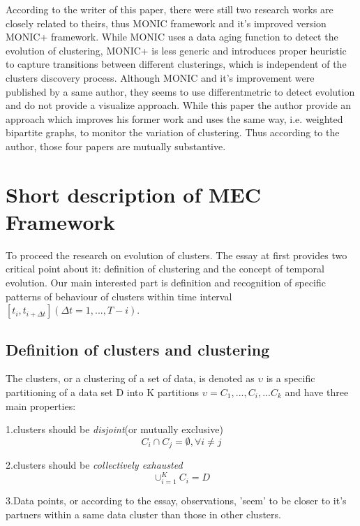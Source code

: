 \documentclass{sig-alternate}
\begin{document}
According to the writer of this paper, there were still two research works are closely related to theirs, thus MONIC framework\cite{SPILIOPOULOU:transition} and it's improved version MONIC+ framework\cite{SPILIOPOULOU:tracing}. While MONIC uses a data aging function to detect the evolution of clustering, MONIC+ is less generic and introduces proper heuristic to capture transitions between different clusterings, which is independent of the clusters discovery process. Although MONIC and it's improvement were published by a same author, they seems to use differentmetric to detect evolution and do not provide a visualize approach. While this paper the author provide an approach which improves his former work\cite{OLIVEIRA:bipartite} and uses the same way, i.e. weighted bipartite graphs, to monitor the variation of clustering. Thus according to the author, those four papers are mutually substantive.

\section{Short description of MEC Framework}
To proceed the research on evolution of clusters. The essay at first provides two critical point about it: definition of clustering and the concept of temporal evolution. Our main interested part is definition and recognition of specific patterns of behaviour of clusters within time interval $[t_i, t_{i+\Delta t}] (\Delta t = 1,...,T-i)$.
\subsection{Definition of clusters and clustering}
The clusters, or a clustering of a set of data, is denoted as $\upsilon$ is a specific partitioning of a data set D into K partitions $\upsilon = {C_1,...,C_i,...C_k}$ and have three main properties:

    1.clusters should be \emph{disjoint}(or mutually exclusive)
        \begin{displaymath}
          C_i\cap C_j = \emptyset, \forall i\ne j
        \end{displaymath}

    2.clusters should be \emph{collectively exhausted}
        \begin{displaymath}
          \cup^K_{i=1}C_i=D
        \end{displaymath}

    3.Data points, or according to the essay, observations, 'seem' to be closer to it's partners within a same data cluster than those in other clusters.
\end{document}
